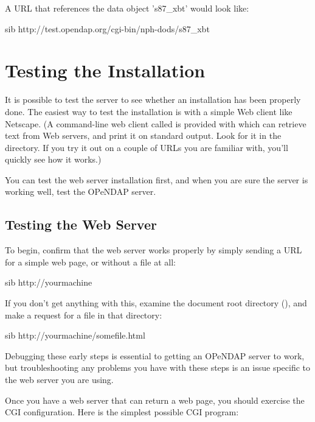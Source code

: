 \documentclass{dods-book}
\begin{document}
A URL that references the data object 's87_xbt' would look like:
  
\begin{vcode}{sib}
http://test.opendap.org/cgi-bin/nph-dods/s87_xbt  
\end{vcode}

\chapter{Testing the Installation}
\label{server,testing}

 It is possible to
test the server to see whether an installation has been properly done.
The easiest way to test the installation is with a simple Web client
like Netscape. (A command-line web client called  is
provided with  which can retrieve text from Web servers,
and print it on standard output. Look for it in the
 directory. If you try it out on a couple of URLs
you are familiar with, you'll quickly see how it works.) 

You can test the web server installation first, and when you are sure
the server is working well, test the OPeNDAP server.

\section{Testing the Web Server}

To begin, confirm that the web server works properly by simply sending a
URL for a simple web page, or without a file at all:

\begin{vcode}{sib}
http://yourmachine
\end{vcode}

If you don't get anything with this, examine the document root
directory (), and make a request for a file in that
directory:

\begin{vcode}{sib}
http://yourmachine/somefile.html
\end{vcode}

Debugging these early steps is essential to getting an OPeNDAP server
to work, but troubleshooting any problems you have with these steps is
an issue specific to the web server you are using.

Once you have a web server that can return a web page, you should
exercise the CGI configuration.  Here is the simplest possible CGI
program: \label{simple,perl}
\end{document}
